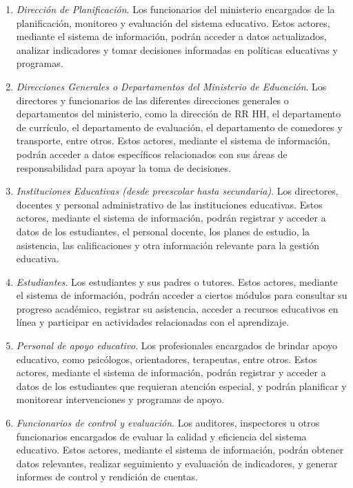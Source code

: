 \documentclass[a4paper, 9pt, conference]{article}              %
\theoremstyle{definition}
\begin{document}
\begin{enumerate}
	\item \emph{Direcci\'on de Planificaci\'on}. Los funcionarios del ministerio encargados de la planificaci\'on, monitoreo y evaluaci\'on del sistema educativo. Estos actores, mediante el sistema de informaci\'on, podr\'an acceder a datos actualizados, analizar indicadores y tomar decisiones informadas en pol\'iticas educativas y programas.

	\item \emph{Direcciones Generales o Departamentos del Ministerio de Educaci\'on}. Los directores y funcionarios de las diferentes direcciones generales o departamentos del ministerio, como la direcci\'on de RR HH, el departamento de curr\'iculo, el departamento de evaluaci\'on, el departamento de comedores y transporte, entre otros. Estos actores, mediante el sistema de informaci\'on, podr\'an acceder a datos espec\'ificos relacionados con sus \'areas de responsabilidad para apoyar la toma de decisiones.

	\item \emph{Instituciones Educativas (desde preescolar hasta secundaria)}. Los directores, docentes y personal administrativo de las instituciones educativas. Estos actores, mediante el sistema de informaci\'on, podr\'an registrar y acceder a datos de los estudiantes, el personal docente, los planes de estudio, la asistencia, las calificaciones y otra informaci\'on relevante para la gesti\'on educativa.

	\item \emph{Estudiantes}. Los estudiantes y sus padres o tutores. Estos actores, mediante el sistema de informaci\'on, podr\'an acceder a ciertos m\'odulos para consultar su progreso acad\'emico, registrar su asistencia, acceder a recursos educativos en l\'inea y participar en actividades relacionadas con el aprendizaje.

	\item \emph{Personal de apoyo educativo}. Los profesionales encargados de brindar apoyo educativo, como psic\'ologos, orientadores, terapeutas, entre otros. Estos actores, mediante el sistema de informaci\'on, podr\'an registrar y acceder a datos de los estudiantes que requieran atenci\'on especial, y podr\'an planificar y monitorear intervenciones y programas de apoyo.

	\item \emph{Funcionarios de control y evaluaci\'on}. Los auditores, inspectores u otros funcionarios encargados de evaluar la calidad y eficiencia del sistema educativo. Estos actores, mediante el sistema de informaci\'on, podr\'an obtener datos relevantes, realizar seguimiento y evaluaci\'on de indicadores, y generar informes de control y rendici\'on de cuentas.


\end{enumerate}
\end{document}
